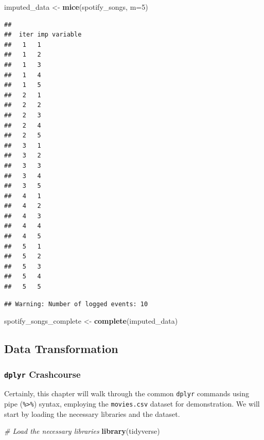 \documentclass[
  b5paper]{book}
\newenvironment{Shaded}{\begin{snugshade}}{\end{snugshade}}
\newcommand{\AttributeTok}[1]{\textcolor[rgb]{0.13,0.29,0.53}{#1}}
\newcommand{\CommentTok}[1]{\textcolor[rgb]{0.56,0.35,0.01}{\textit{#1}}}
\newcommand{\DecValTok}[1]{\textcolor[rgb]{0.00,0.00,0.81}{#1}}
\newcommand{\FunctionTok}[1]{\textcolor[rgb]{0.13,0.29,0.53}{\textbf{#1}}}
\newcommand{\NormalTok}[1]{#1}
\newcommand{\OtherTok}[1]{\textcolor[rgb]{0.56,0.35,0.01}{#1}}
\begin{document}
\begin{Shaded}
\begin{Highlighting}[]
\NormalTok{imputed\_data }\OtherTok{\textless{}{-}} \FunctionTok{mice}\NormalTok{(spotify\_songs, }\AttributeTok{m=}\DecValTok{5}\NormalTok{)}
\end{Highlighting}
\end{Shaded}

\begin{verbatim}
## 
##  iter imp variable
##   1   1
##   1   2
##   1   3
##   1   4
##   1   5
##   2   1
##   2   2
##   2   3
##   2   4
##   2   5
##   3   1
##   3   2
##   3   3
##   3   4
##   3   5
##   4   1
##   4   2
##   4   3
##   4   4
##   4   5
##   5   1
##   5   2
##   5   3
##   5   4
##   5   5
\end{verbatim}

\begin{verbatim}
## Warning: Number of logged events: 10
\end{verbatim}

\begin{Shaded}
\begin{Highlighting}[]
\NormalTok{spotify\_songs\_complete }\OtherTok{\textless{}{-}} \FunctionTok{complete}\NormalTok{(imputed\_data)}
\end{Highlighting}
\end{Shaded}

\hypertarget{data-transformation}{%
\subsection*{Data Transformation}\label{data-transformation}}

\hypertarget{dplyr-crashcourse}{%
\subsubsection*{\texorpdfstring{\texttt{dplyr} Crashcourse}{dplyr Crashcourse}}\label{dplyr-crashcourse}}

Certainly, this chapter will walk through the common \texttt{dplyr} commands using pipe (\texttt{\%\textgreater{}\%}) syntax, employing the \texttt{movies.csv} dataset for demonstration. We will start by loading the necessary libraries and the dataset.

\begin{Shaded}
\begin{Highlighting}[]
\CommentTok{\# Load the necessary libraries}
\FunctionTok{library}\NormalTok{(tidyverse)}
\end{Highlighting}
\end{Shaded}
\end{document}
